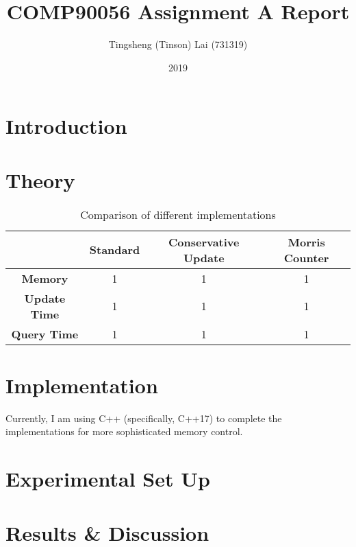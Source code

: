 \documentclass[a4paper]{article}
\title{\textbf{COMP90056 Assignment A Report}}
\author{Tingsheng (Tinson) Lai (731319)}
\date{2019}
\begin{document}
    \maketitle
    \section{Introduction}
    \section{Theory}
        \begin{table}[!h]
            \centering
            \begin{tabular}{|c|c|c|c|}
                \hline
                                     & \textbf{Standard} & \textbf{Conservative Update} & \textbf{Morris Counter} \\
                \hline
                \textbf{Memory}      & 1                 & 1                            & 1                       \\
                \hline
                \textbf{Update Time} & 1                 & 1                            & 1                       \\
                \hline
                \textbf{Query Time}  & 1                 & 1                            & 1                       \\
                \hline
            \end{tabular}
            \caption{Comparison of different implementations}
            \label{table:comparison}
        \end{table}
    \section{Implementation}
        Currently, I am using C++ (specifically, C++17) to complete the implementations for more sophisticated memory control.
    \section{Experimental Set Up}
    \section{Results \& Discussion}
\end{document}
